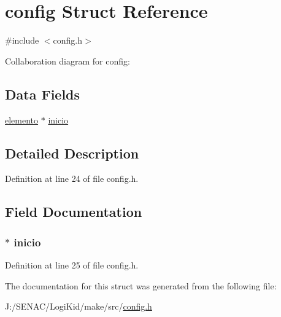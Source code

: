\hypertarget{structconfig}{\section{config Struct Reference}
\label{structconfig}
}


{\ttfamily \#include $<$config.\-h$>$}



Collaboration diagram for config\-:
\subsection*{Data Fields}
\begin{DoxyCompactItemize}
\item 
\hyperlink{config_8h_a264461903d572c81f91bd5c50c7c4859}{elemento} $\ast$ \hyperlink{structconfig_a2613a654ec9846270b5aa0d63cebee60}{inicio}
\end{DoxyCompactItemize}


\subsection{Detailed Description}


Definition at line 24 of file config.\-h.



\subsection{Field Documentation}
\hypertarget{structconfig_a2613a654ec9846270b5aa0d63cebee60}{
\subsubsection[{inicio}]{$\ast$ inicio}}\label{structconfig_a2613a654ec9846270b5aa0d63cebee60}


Definition at line 25 of file config.\-h.



The documentation for this struct was generated from the following file\-:\begin{DoxyCompactItemize}
\item 
J\-:/\-S\-E\-N\-A\-C/\-Logi\-Kid/make/src/\hyperlink{config_8h}{config.\-h}\end{DoxyCompactItemize}
